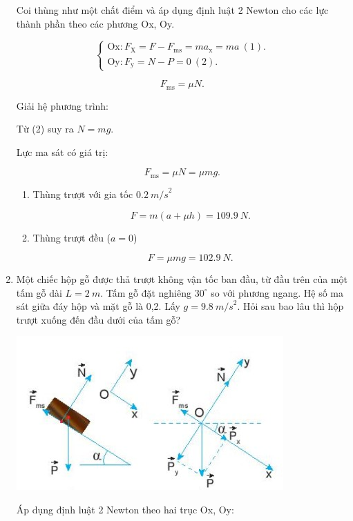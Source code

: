 \begin{enumerate}[label=\bfseries Câu \arabic*:]
{	Coi thùng như một chất điểm và áp dụng định luật 2 Newton cho các lực thành phần theo các phương Ox, Oy.
	
	$$\begin{cases}
		\text{Ox}: F_\text{X} = F - F_\text{ms} = ma_\text{x} = ma\ (1).\\
		\text{Oy}: F_\text{y} = N - P =0\ (2).
	\end{cases}$$

	$$F_\text{ms} = \mu N.$$
	
	Giải hệ phương trình:
	
	Từ (2) suy ra $N = mg$.
	
	Lực ma sát có giá trị:
	
	$$F_\text{ms} = \mu N = \mu mg.$$
	
	\begin{enumerate}[label=\alph*)]
		\item  Thùng trượt với gia tốc $\SI{0,2}{m/s}^2$
		
		$$F = m(a + \mu h) = \SI{109,9}{N}.$$
		\item Thùng trượt đều ($a =0$)
		
		$$F = \mu mg = \SI{102,9}{N}.$$
		
	\end{enumerate}

	
	}
	\item {}
	
	
	{
		Một chiếc hộp gỗ được thả trượt không vận tốc ban đầu, từ đầu trên của một tấm gỗ dài $L = \SI{2}{m}$. Tấm gỗ đặt nghiêng $30^\circ$ so với phương ngang. Hệ số ma sát giữa đáy hộp và mặt gỗ là 0,2. Lấy $g = \SI{9,8}{m/s}^2$. Hỏi sau bao lâu thì hộp trượt xuống đến đầu dưới của tấm gỗ?
	}
	
	\hideall
	{
		\begin{center}
			\includegraphics[scale=1]{../figs/VN10-2022-PH-TP021-3.jpg}
		\end{center}
		
		Áp dụng định luật 2 Newton theo hai trục Ox, Oy:
		
}
\end{enumerate}

